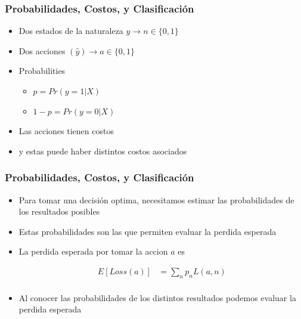 \documentclass[
  shownotes,
  xcolor={svgnames},
  hyperref={colorlinks,citecolor=DarkBlue,linkcolor=DarkRed,urlcolor=DarkBlue}
  , aspectratio=169]{beamer}
\begin{document}
\begin{frame}[fragile]
\frametitle{Probabilidades, Costos, y Clasificación}

\begin{itemize}
  \item Dos estados de la naturaleza $y \rightarrow n\in\{0,1\}$
  \medskip
  \item Dos acciones $(\hat{y}) \rightarrow a\in \{0,1\}$
  \medskip
  \item Probabilities
  \begin{itemize}
    \item $p=Pr(y=1|X)$
    \item $1-p=Pr(y=0|X)$
  \end{itemize}
  \medskip
  \item Las acciones tienen costos
  \item y estas puede haber distintos costos asociados 

\end{itemize}


\end{frame}
\begin{frame}[fragile]
\frametitle{Probabilidades, Costos, y Clasificación}

\begin{itemize}
  \item Para tomar una decisión optima, necesitamos estimar las probabilidades de los resultados posibles
  \medskip
  \item Estas probabilidades son las que permiten evaluar la perdida esperada
  \medskip
  \item La perdida esperada por tomar la accion $a$ es

\medskip
\begin{align}
E[Loss(a)] &= \sum_n p_n L(a,n) \\ \nonumber
\end{align}


  \item Al conocer las probabilidades de los distintos resultados podemos evaluar la perdida esperada
  
\end{itemize}
\end{frame}
\end{document}
